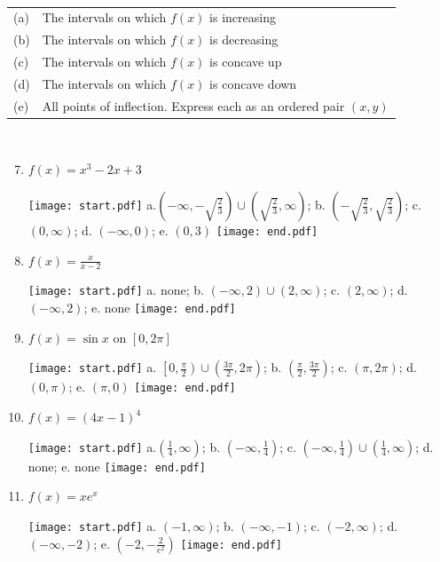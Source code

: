 \documentclass[12pt]{article}
\begin{document}
\\

\begin{tabular}{ll}
(a) & The intervals on which $f(x)$ is increasing\\
(b) & The intervals on which $f(x)$ is decreasing\\
(c) & The intervals on which $f(x)$ is concave up\\
(d) & The intervals on which $f(x)$ is concave down\\
(e) & All points of inflection.  Express each as an ordered pair $(x,y)$
\end{tabular}\\

\begin{enumerate}
\setcounter{enumi}{6}

\item $f(x) = x^3-2x+3$ 

\texttt{[image: start.pdf]}
{{a.$\left(-\infty, -\sqrt{\frac{2}{3}}\right)\cup \left(\sqrt{\frac{2}{3}}, \infty \right)$; b. $\left(-\sqrt{\frac{2}{3}},\sqrt{\frac{2}{3}}\right)$; c. $(0,\infty)$; d. $(-\infty,0)$; e. $(0,3)$}}
\texttt{[image: end.pdf]}


\item $f(x) = \frac{x}{x-2}$ 

\texttt{[image: start.pdf]}
{{a. none; b. $(-\infty,2) \cup (2,\infty)$; c. $(2,\infty)$; d. $(-\infty, 2)$; e. none}}
\texttt{[image: end.pdf]}


\item $f(x) = \sin{x} \text{ on } [0,2\pi]$ 

\texttt{[image: start.pdf]}
{{a. $\left[0, \frac{\pi}{2}\right)\cup \left(\frac{3\pi}{2},2\pi \right)$; b. $ \left(\frac{\pi}{2}, \frac{3\pi}{2} \right)$; c. $(\pi, 2\pi)$; d. $(0,\pi)$; e. $(\pi,0)$}}
\texttt{[image: end.pdf]}


\item $f(x) = (4x-1)^4$ 

\texttt{[image: start.pdf]}
{{a.$\left(\frac{1}{4},\infty \right)$; b. $\left(-\infty, \frac{1}{4}\right)$; c. $\left(-\infty,\frac{1}{4}\right) \cup \left(\frac{1}{4},\infty \right)$; d. none; e. none}}
\texttt{[image: end.pdf]}


\item $f(x) = xe^x$ 

\texttt{[image: start.pdf]}
{{a. $(-1, \infty)$; b. $(-\infty, -1)$; c. $(-2,\infty)$; d. $(-\infty, -2)$; e. $\left(-2,-\frac{2}{e^2}\right)$}}
\texttt{[image: end.pdf]}



\end{enumerate}
\end{document}
